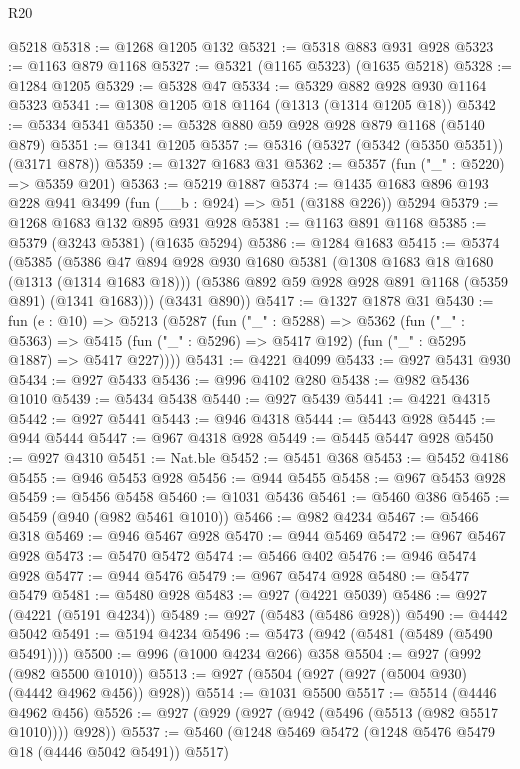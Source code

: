 \begin{lexlean}{R20}
\begin{coremodule}
    @5218
@5318 := @1268 @1205 @132
@5321 := @5318 @883 @931 @928
@5323 := @1163 @879 @1168
@5327 := @5321 (@1165 @5323) (@1635 @5218)
@5328 := @1284 @1205
@5329 := @5328 @47
@5334 := @5329 @882 @928 @930 @1164 @5323
@5341 := @1308 @1205 @18 @1164 (@1313 (@1314 @1205 @18))
@5342 := @5334 @5341
@5350 := @5328 @880 @59 @928 @928 @879 @1168 (@5140 @879)
@5351 := @1341 @1205
@5357 := @5316 (@5327 (@5342 (@5350 @5351)) (@3171 @878))
@5359 := @1327 @1683 @31
@5362 := @5357 (fun ("_" : @5220) => @5359 @201)
@5363 := @5219 @1887
@5374 := @1435 @1683 @896 @193 @228 @941 @3499 (fun (__b : @924) => @51 (@3188 @226)) @5294
@5379 := @1268 @1683 @132 @895 @931 @928
@5381 := @1163 @891 @1168
@5385 := @5379 (@3243 @5381) (@1635 @5294)
@5386 := @1284 @1683
@5415 := @5374
    (@5385
      (@5386
        @47
        @894
        @928
        @930
        @1680
        @5381
        (@1308 @1683 @18 @1680 (@1313 (@1314 @1683 @18)))
        (@5386 @892 @59 @928 @928 @891 @1168 (@5359 @891) (@1341 @1683)))
      (@3431 @890))
@5417 := @1327 @1878 @31
@5430 := fun (e : @10) =>
  @5213
    (@5287
      (fun ("_" : @5288) =>
      @5362
        (fun ("_" : @5363) =>
        @5415 (fun ("_" : @5296) => @5417 @192) (fun ("_" : @5295 @1887) => @5417 @227))))
@5431 := @4221 @4099
@5433 := @927 @5431 @930
@5434 := @927 @5433
@5436 := @996 @4102 @280
@5438 := @982 @5436 @1010
@5439 := @5434 @5438
@5440 := @927 @5439
@5441 := @4221 @4315
@5442 := @927 @5441
@5443 := @946 @4318
@5444 := @5443 @928
@5445 := @944 @5444
@5447 := @967 @4318 @928
@5449 := @5445 @5447 @928
@5450 := @927 @4310
@5451 := Nat.ble
@5452 := @5451 @368
@5453 := @5452 @4186
@5455 := @946 @5453 @928
@5456 := @944 @5455
@5458 := @967 @5453 @928
@5459 := @5456 @5458
@5460 := @1031 @5436
@5461 := @5460 @386
@5465 := @5459 (@940 (@982 @5461 @1010))
@5466 := @982 @4234
@5467 := @5466 @318
@5469 := @946 @5467 @928
@5470 := @944 @5469
@5472 := @967 @5467 @928
@5473 := @5470 @5472
@5474 := @5466 @402
@5476 := @946 @5474 @928
@5477 := @944 @5476
@5479 := @967 @5474 @928
@5480 := @5477 @5479
@5481 := @5480 @928
@5483 := @927 (@4221 @5039)
@5486 := @927 (@4221 (@5191 @4234))
@5489 := @927 (@5483 (@5486 @928))
@5490 := @4442 @5042
@5491 := @5194 @4234
@5496 := @5473 (@942 (@5481 (@5489 (@5490 @5491))))
@5500 := @996 (@1000 @4234 @266) @358
@5504 := @927 (@992 (@982 @5500 @1010))
@5513 := @927 (@5504 (@927 (@927 (@5004 @930) (@4442 @4962 @456)) @928))
@5514 := @1031 @5500
@5517 := @5514 (@4446 @4962 @456)
@5526 := @927 (@929 (@927 (@942 (@5496 (@5513 (@982 @5517 @1010)))) @928))
@5537 := @5460 (@1248 @5469 @5472 (@1248 @5476 @5479 @18 (@4446 @5042 @5491)) @5517)

\end{coremodule}
\end{lexlean}
